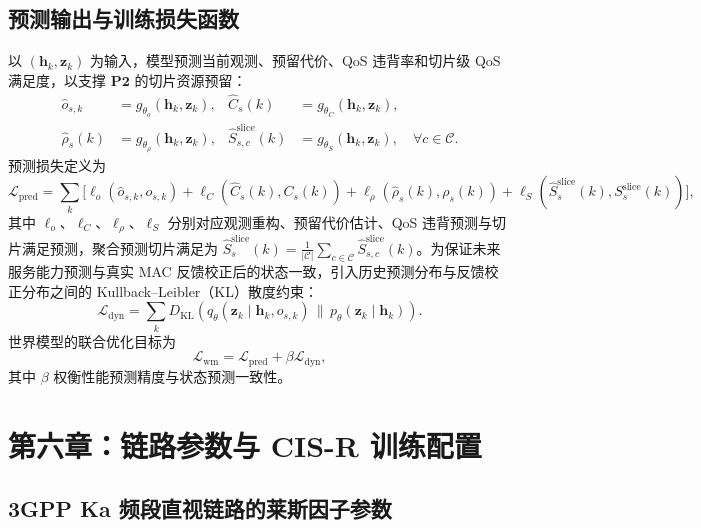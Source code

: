 \section{预测输出与训练损失函数}
\label{app:ch5_training_loss}

以 $(\boldsymbol h_k,\boldsymbol z_k)$ 为输入，模型预测当前观测、预留代价、QoS 违背率和切片级 QoS 满足度，以支撑 $\mathbf{P2}$ 的切片资源预留：
\begin{equation}\label{eq:ch4_predheads}
\begin{aligned}
\hat o_{s,k}&=g_{\theta_o}(\boldsymbol h_k,\boldsymbol z_k), & \hat C_s(k)&=g_{\theta_C}(\boldsymbol h_k,\boldsymbol z_k),\\
\hat\rho_s(k)&=g_{\theta_\rho}(\boldsymbol h_k,\boldsymbol z_k), & \hat S_{s,c}^{\mathrm{slice}}(k)&=g_{\theta_S}(\boldsymbol h_k,\boldsymbol z_k),\quad\forall c\in\mathcal C.
\end{aligned}
\end{equation}
预测损失定义为
\begin{equation}\label{eq:ch4_lpred}
\mathcal L_{\mathrm{pred}}=\sum_k\Big[\ell_o(\hat o_{s,k},o_{s,k})+\ell_C(\hat C_s(k),C_s(k))+\ell_\rho(\hat\rho_s(k),\rho_s(k))+\ell_S(\hat S_s^{\mathrm{slice}}(k),S_s^{\mathrm{slice}}(k))\Big],
\end{equation}
其中 $\ell_o$、$\ell_C$、$\ell_\rho$、$\ell_S$ 分别对应观测重构、预留代价估计、QoS 违背预测与切片满足预测，聚合预测切片满足为 $\hat S_s^{\mathrm{slice}}(k)=\frac{1}{|\mathcal C|}\sum_{c\in\mathcal C}\hat S_{s,c}^{\mathrm{slice}}(k)$。为保证未来服务能力预测与真实 MAC 反馈校正后的状态一致，引入历史预测分布与反馈校正分布之间的 Kullback--Leibler（KL）散度约束：
\begin{equation}\label{eq:ch4_ldyn}
\mathcal L_{\mathrm{dyn}}=\sum_k D_{\mathrm{KL}}\!\left(q_\theta(\boldsymbol z_k\mid\boldsymbol h_k,o_{s,k})\,\big\|\,p_\theta(\boldsymbol z_k\mid\boldsymbol h_k)\right).
\end{equation}
世界模型的联合优化目标为
\begin{equation}\label{eq:ch4_lwm}
\mathcal L_{\mathrm{wm}}=\mathcal L_{\mathrm{pred}}+\beta\mathcal L_{\mathrm{dyn}},
\end{equation}
其中 $\beta$ 权衡性能预测精度与状态预测一致性。

\chapter{第六章：链路参数与 CIS-R 训练配置}

\section{3GPP Ka 频段直视链路的莱斯因子参数}
\label{app:rician_k_factors}

